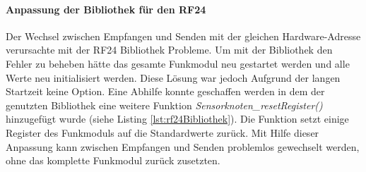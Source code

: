 \paragraph{Anpassung der Bibliothek für den RF24} Der Wechsel zwischen Empfangen und Senden mit der gleichen Hardware-Adresse verursachte mit der RF24 Bibliothek Probleme. Um mit der Bibliothek den Fehler zu beheben hätte das gesamte Funkmodul neu gestartet werden und alle Werte neu initialisiert werden. Diese Lösung war jedoch Aufgrund der langen Startzeit keine Option. Eine Abhilfe konnte geschaffen werden in dem der genutzten Bibliothek eine weitere Funktion \textit{Sensorknoten\_resetRegister()} hinzugefügt wurde (siehe Listing \ref{lst:rf24Bibliothek}). Die Funktion setzt einige Register des Funkmoduls auf die Standardwerte zurück. Mit Hilfe dieser Anpassung kann zwischen Empfangen und Senden problemlos gewechselt werden, ohne das komplette Funkmodul zurück zusetzten.



